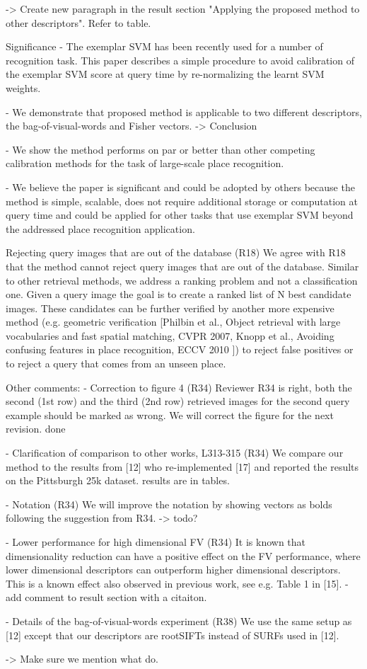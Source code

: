 -> Create new paragraph in the result section "Applying the proposed
method to other descriptors".
Refer to table.


Significance
- The exemplar SVM has been recently used for a number of recognition
task. This paper describes a simple procedure to avoid calibration of
the exemplar SVM score at query time by re-normalizing the learnt SVM
weights.

- We demonstrate that proposed method is applicable to two different
descriptors, the bag-of-visual-words and Fisher vectors.
-> Conclusion

- We show the method performs on par or better than other competing
calibration methods for the task of large-scale place recognition.

- We believe the paper is significant and could be adopted by others
because the method is simple, scalable, does not require additional
storage or computation at query time and could be applied for other
tasks that use exemplar SVM beyond the addressed place recognition
application.




Rejecting query images that are out of the database (R18)
We agree with R18 that the method cannot reject query images that are
out of the database. Similar to other retrieval methods, we address a
ranking problem and not a classification one. Given a query image the
goal is to create a ranked list of N best candidate images. These
candidates can be further verified by another more expensive method
(e.g. geometric verification [Philbin et al., Object retrieval with
large vocabularies and fast spatial matching, CVPR 2007, Knopp et al.,
Avoiding confusing features in place recognition, ECCV 2010 ]) to
reject false positives or to reject a query that comes from an unseen
place.


Other comments:
- Correction to figure 4 (R34)
Reviewer R34 is right, both the second (1st row) and the third (2nd
row) retrieved images for the second query example should be marked as
wrong. We will correct the figure for the next revision.
done

- Clarification of comparison to other works, L313-315 (R34)
We compare our method to the results from [12] who re-implemented [17]
and reported the results on the Pittsburgh 25k dataset.
results are in tables.

- Notation (R34)
We will improve the notation by showing vectors as bolds following the
suggestion from R34.
-> todo?

- Lower performance for high dimensional FV (R34)
It is known that dimensionality reduction can have a positive effect
on the FV performance, where lower dimensional descriptors can
outperform higher dimensional descriptors. This is a known effect also
observed in previous work, see e.g. Table 1 in [15].
- add comment to result section with a citaiton.

- Details of the bag-of-visual-words experiment (R38)
We use the same setup as [12] except that our descriptors are
rootSIFTs instead of SURFs used in [12].

-> Make sure we mention what do.
